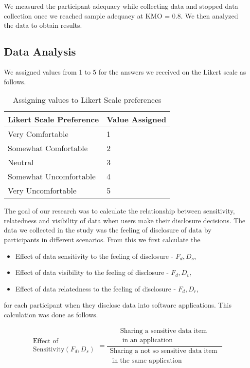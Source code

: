 \documentclass[10pt]{article}
\begin{document}
We measured the participant adequacy while collecting data and stopped data collection once we reached sample adequacy at KMO = 0.8. We then analyzed the data to obtain results.

\subsection {Data Analysis}

We assigned values from 1 to 5 for the answers we received on the Likert scale as follows.

\begin{center}
\begin{table}[htbp]
\caption{Assigning values to Likert Scale preferences}
\begin{center}
\begin{tabular}{|l|l|} 
\hline
Likert Scale Preference & Value Assigned \\
\hline
Very Comfortable & 1\\
\hline
Somewhat Comfortable& 2 \\
\hline
Neutral & 3  \\
\hline
Somewhat Uncomfortable & 4 \\
\hline
Very Uncomfortable & 5 \\
\hline
\end{tabular}
\end{center}
\end{table}
\end{center}

The goal of our research was to calculate the relationship between sensitivity, relatedness and visibility of data when users make their disclosure decisions. The data we collected in the study was the feeling of disclosure of data by participants in different scenarios. From this we first calculate the
\begin{itemize}
\item Effect of data sensitivity to the feeling of disclosure -  $F_d,D_s$, 
\item Effect of data visibility to the feeling of disclosure -  $F_d,D_v$, 
\item Effect of data relatedness to the feeling of disclosure -  $F_d,D_r$, 
\end{itemize}

for each participant when they disclose data into software applications. This calculation was done as follows.

\[ \begin{aligned} \text{Effect of } \\ \text{Sensitivity}(F_{d}, D_{s}) \end{aligned} =
\frac{\begin{aligned}
      \text{Sharing a sensitive data item } \\ \text{ in an application}
      \end{aligned}}%
 {\begin{aligned}
      \text{Sharing a not so sensitive data item }\\ \text{ in the same application}
      \end{aligned}}
\]
\end{document}
